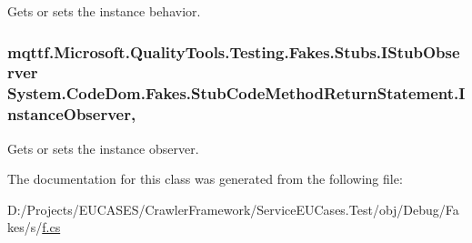Gets or sets the instance behavior.

\hypertarget{class_system_1_1_code_dom_1_1_fakes_1_1_stub_code_method_return_statement_a94be9a3c0c7285364d76384880172672}{
\subsubsection[{Instance\-Observer}]{\setlength{\rightskip}{0pt plus 5cm}mqttf.\-Microsoft.\-Quality\-Tools.\-Testing.\-Fakes.\-Stubs.\-I\-Stub\-Observer System.\-Code\-Dom.\-Fakes.\-Stub\-Code\-Method\-Return\-Statement.\-Instance\-Observer\hspace{0.3cm}{\ttfamily [get]}, {\ttfamily [set]}}}\label{class_system_1_1_code_dom_1_1_fakes_1_1_stub_code_method_return_statement_a94be9a3c0c7285364d76384880172672}


Gets or sets the instance observer.



The documentation for this class was generated from the following file\-:\begin{DoxyCompactItemize}
\item 
D\-:/\-Projects/\-E\-U\-C\-A\-S\-E\-S/\-Crawler\-Framework/\-Service\-E\-U\-Cases.\-Test/obj/\-Debug/\-Fakes/s/\hyperlink{s_2f_8cs}{f.\-cs}\end{DoxyCompactItemize}
